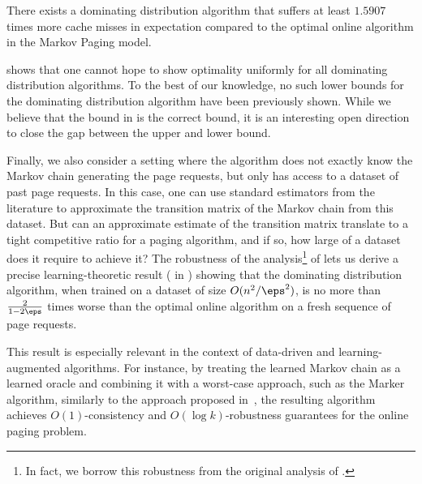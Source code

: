 \documentclass[11pt]{article}
\begin{document}
\begin{theorem}
    \label{thm:dominating-distribution-lower-bound}
    There exists a dominating distribution algorithm that suffers at least $1.5907$ times more cache misses in expectation compared to the optimal online algorithm in the Markov Paging model.
\end{theorem}

 shows that one cannot hope to show optimality uniformly for all dominating distribution algorithms. To the best of our knowledge, no such lower bounds for the dominating distribution algorithm have been previously shown. While we believe that the bound in  is the correct bound, it is an interesting open direction to close the gap between the upper and lower bound. 

Finally, we also consider a setting where the algorithm does not exactly know the Markov chain generating the page requests, but only has access to a dataset of past page requests. In this case, one can use standard estimators from the literature to approximate the transition matrix of the Markov chain from this dataset. But can an approximate estimate of the transition matrix translate to a tight competitive ratio for a paging algorithm, and if so, how large of a dataset does it require to achieve it? The robustness of the analysis\footnote{In fact, we borrow this robustness from the original analysis of \cite{lund1994ip}.} of  lets us derive a precise learning-theoretic result ( in ) showing that the dominating distribution algorithm, when trained on a dataset of size $O(n^2/\eps^2)$, is no more than $\frac{2}{1-2\eps}$ times worse than the optimal online algorithm on a fresh sequence of page requests. 

This result is especially relevant in the context of data-driven and learning-augmented algorithms. For instance, by treating the learned Markov chain as a learned oracle and combining it with a worst-case approach, such as the Marker algorithm, similarly to the approach proposed in~\citep{mahdian2012online,lykouris2021competitive}, the resulting algorithm achieves $O(1)$-consistency and $O(\log k)$-robustness guarantees for the online paging problem.
\end{document}
